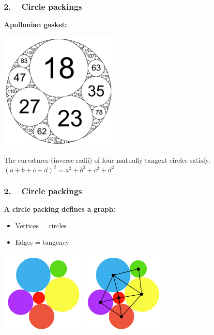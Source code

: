\begin{frame}
\frametitle{2. ~ Circle packings}



{\bfseries Apollonian gasket:}

\begin{center}
\includegraphics[width=170pt]{images/ApollonianGasket.png}
\end{center}

The curvatures (inverse radii) of four mutually tangent circles satisfy:
$(a + b + c + d)^2 = a^2 + b^2 + c^2 + d^2 $

\end{frame}



\begin{frame}
\frametitle{2. ~ Circle packings}



{\bfseries A circle packing defines a graph:} \pause
\begin{itemize}[$\bullet$]
 \item Vertices = circles
 \item Edges = tangency
\end{itemize}

\bigskip \pause

\begin{center}
\includegraphics[width=120pt]{images/CP8b.png} \hspace{20pt} \pause
\includegraphics[width=120pt]{images/CP8c.pdf}
\end{center}

\end{frame}




